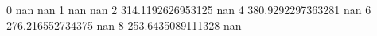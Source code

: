 0 nan nan
1 nan nan
2 314.1192626953125 nan
4 380.9292297363281 nan
6 276.216552734375 nan
8 253.6435089111328 nan
